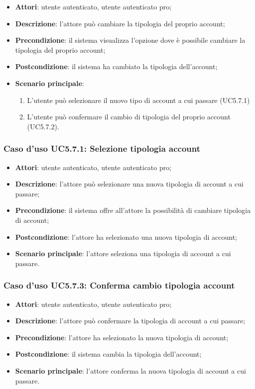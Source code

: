 \begin{itemize}
	\item \textbf{Attori}: utente autenticato, utente autenticato pro;
	\item \textbf{Descrizione}: l'attore può cambiare la tipologia del proprio account; 
	\item \textbf{Precondizione}: il sistema visualizza l'opzione dove è possibile cambiare la tipologia del proprio account;
	\item \textbf{Postcondizione}: il sistema ha cambiato la tipologia dell'account;
	\item \textbf{Scenario principale}:
	\begin{enumerate}
		\item L'utente può selezionare il nuovo tipo di account a cui passare (UC5.7.1)
		\item L'utente può confermare il cambio di tipologia del proprio account (UC5.7.2).
	\end{enumerate}
\end{itemize}

\subsubsection{Caso d'uso UC5.7.1: Selezione tipologia account}

\begin{itemize}
	\item \textbf{Attori}: utente autenticato, utente autenticato pro;
	\item \textbf{Descrizione}: l'attore può selezionare una nuova tipologia di account a cui passare;
	\item \textbf{Precondizione}: il sistema offre all'attore la possibilità di cambiare tipologia di account;
	\item \textbf{Postcondizione}: l'attore ha selezionato  una nuova tipologia di account;
	\item \textbf{Scenario principale}: l'attore seleziona una tipologia di account a cui passare.
\end{itemize}

\subsubsection{Caso d'uso UC5.7.3: Conferma cambio tipologia account}

\begin{itemize}
	\item \textbf{Attori}: utente autenticato, utente autenticato pro;
	\item \textbf{Descrizione}: l'attore può confermare la tipologia di account a cui passare;
	\item \textbf{Precondizione}: l'attore ha selezionato la nuova tipologia di account;
	\item \textbf{Postcondizione}: il sistema cambia la tipologia dell'account;
	\item \textbf{Scenario principale}: l'attore conferma la nuova tipologia di account a cui passare.
\end{itemize}

